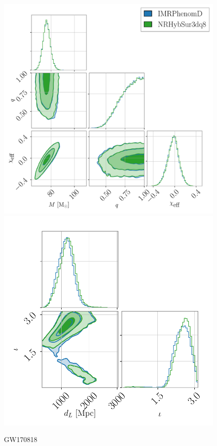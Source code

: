\documentclass[prd,superscriptaddress,twocolumn,nopreprintnumbers,floatfix,longbibliography]{revtex4}
\begin{document}
\begin{appendix}
\begin{figure}[t!]
    \centering
    \includegraphics[width=0.56\linewidth]{GW170818_marg_intrinsic.pdf}
    \includegraphics[width=0.405\linewidth]{GW170818_marg_extrinsic.pdf}
    \caption{
    GW170818}
    \label{fig:GW170818}
\end{figure}


\end{appendix}
\end{document}

